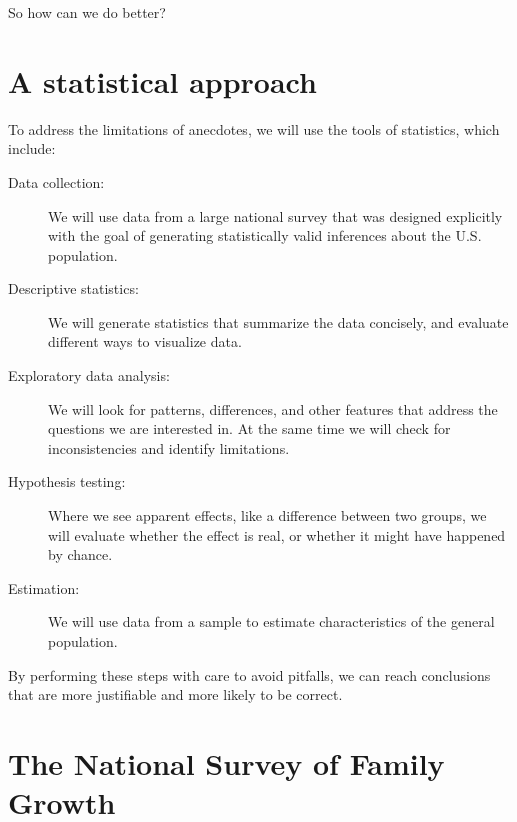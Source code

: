 \documentclass[12pt]{book}
\begin{document}
So how can we do better?

\section{A statistical approach}

To address the limitations of anecdotes, we will use the tools
of statistics, which include:

\begin{description}

\item[Data collection:] We will use data from a large national survey
  that was designed explicitly with the goal of generating
  statistically valid inferences about the U.S. population.


\item[Descriptive statistics:] We will generate statistics that
  summarize the data concisely, and evaluate different ways to
  visualize data.


\item[Exploratory data analysis:] We will look for
  patterns, differences, and other features that address the questions
  we are interested in.  At the same time we will check for
  inconsistencies and identify limitations.


\item[Hypothesis testing:] Where we see apparent effects, like a
  difference between two groups, we will evaluate whether the effect
  is real, or whether it might have happened by chance.


\item[Estimation:] We will use data from a sample to estimate
  characteristics of the general population.


\end{description}

By performing these steps with care to avoid pitfalls, we can
reach conclusions that are more justifiable and more likely to be
correct.


\section{The National Survey of Family Growth}
\label{nsfg}
\end{document}
